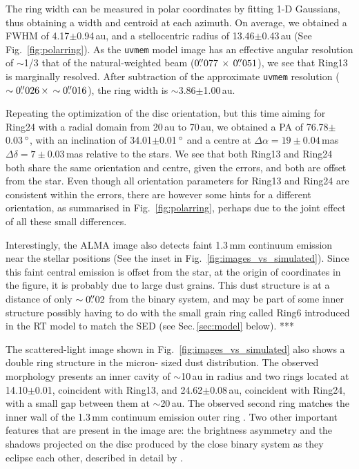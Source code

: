 \documentclass[letters,usenatbib,times]{mnras}
\begin{document}
The ring width can be measured in polar coordinates by fitting 1-D Gaussians, thus obtaining a width and centroid at each azimuth. On average, we obtained a FWHM of 4.17$\pm$0.94\,au, and a stellocentric radius of 13.46$\pm$0.43\,au (See Fig.~\ref{fig:polarring}). As the {\tt uvmem} model image has an effective angular resolution of $\sim$1/3 that of the natural-weighted beam ($0\hbox{$.\!\!^{\prime\prime}$}077 \,\times \, 0\hbox{$.\!\!^{\prime\prime}$}051$), we see that Ring13 is marginally resolved. After subtraction of the approximate {\tt uvmem} resolution ($\sim0\hbox{$.\!\!^{\prime\prime}$}026 \, \times \, \sim0\hbox{$.\!\!^{\prime\prime}$}016$), the ring width is $\sim$3.86$\pm$1.00\,au. 

Repeating the optimization of the disc orientation, but this time aiming for Ring24 with a radial domain from 20\,au to 70\,au, we obtained a PA of 76.78$\pm$0.03\,$\hbox{$^\circ$}$, with an inclination of 34.01$\pm$0.01\,$\hbox{$^\circ$}$ and a centre at $\Delta \alpha = 19\pm0.04$\,mas $\Delta \delta = 7\pm0.03$\,mas relative to the stars. We see that both Ring13 and Ring24 both share the same orientation and centre, given the errors, and both are offset from the star. Even though all orientation parameters for Ring13 and Ring24 are consistent within the errors, there are however some hints for a different orientation, as summarised in Fig.~\ref{fig:polarring}, perhaps due to the joint effect of all these small differences.

Interestingly, the ALMA image also detects faint 1.3\,mm continuum emission near the stellar positions (See the inset in Fig.~\ref{fig:images_vs_simulated}). Since this faint central emission is offset from the star, at the origin of coordinates in the figure, it is probably due to large dust grains. This dust structure is at a distance of only $\sim0\hbox{$.\!\!^{\prime\prime}$}02$ from the binary system, and may be part of some inner structure possibly having to do with the small grain ring called Ring6 introduced in the RT model to match the SED (see Sec.\,\ref{sec:model} below). ***

The scattered-light image shown in Fig.~\ref{fig:images_vs_simulated} also shows a double ring structure in the micron-
sized dust distribution. The observed morphology presents an inner cavity of $\sim$10\,au in radius and two rings located at 14.10$\pm$0.01, coincident with Ring13, and 24.62$\pm$0.08\,au, coincident with Ring24, with a small gap between them at $\sim$20\,au. The observed second ring matches the inner wall of the 1.3\,mm continuum emission outer ring \citep{Ru_z_Rodr_guez_2019}. Two other important features that are present in the image are: the brightness asymmetry and the shadows projected on the disc produced by the close binary system as they eclipse each other, described in detail by \citet{dOrazi}.
\end{document}
